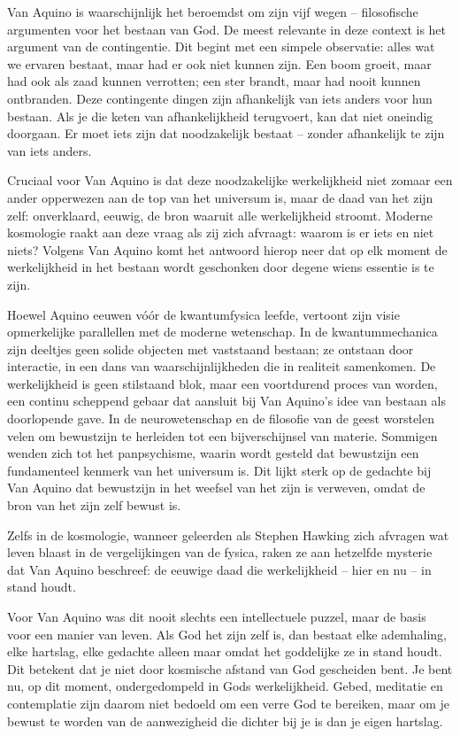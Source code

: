 Van Aquino is waarschijnlijk het beroemdst om zijn vijf wegen – filosofische argumenten voor het bestaan van God. De meest relevante in deze context is het argument van de contingentie. Dit begint met een simpele observatie: alles wat we ervaren bestaat, maar had er ook niet kunnen zijn. Een boom groeit, maar had ook als zaad kunnen verrotten; een ster brandt, maar had nooit kunnen ontbranden. Deze contingente dingen zijn afhankelijk van iets anders voor hun bestaan. Als je die keten van afhankelijkheid terugvoert, kan dat niet oneindig doorgaan. Er moet iets zijn dat noodzakelijk bestaat – zonder afhankelijk te zijn van iets anders.

Cruciaal voor Van Aquino is dat deze noodzakelijke werkelijkheid niet zomaar een ander opperwezen aan de top van het universum is, maar de daad van het zijn zelf: onverklaard, eeuwig, de bron waaruit alle werkelijkheid stroomt. Moderne kosmologie raakt aan deze vraag als zij zich afvraagt: waarom is er iets en niet niets? Volgens Van Aquino komt het antwoord hierop neer dat op elk moment de werkelijkheid in het bestaan wordt geschonken door degene wiens essentie is te zijn.

Hoewel Aquino eeuwen vóór de kwantumfysica leefde, vertoont zijn visie opmerkelijke parallellen met de moderne wetenschap. In de kwantummechanica zijn deeltjes geen solide objecten met vaststaand bestaan; ze ontstaan door interactie, in een dans van waarschijnlijkheden die in realiteit samenkomen. De werkelijkheid is geen stilstaand blok, maar een voortdurend proces van worden, een continu scheppend gebaar dat aansluit bij Van Aquino’s idee van bestaan als doorlopende gave. In de neurowetenschap en de filosofie van de geest worstelen velen om bewustzijn te herleiden tot een bijverschijnsel van materie. Sommigen wenden zich tot het panpsychisme, waarin wordt gesteld dat bewustzijn een fundamenteel kenmerk van het universum is. Dit lijkt sterk op de gedachte bij Van Aquino dat bewustzijn in het weefsel van het zijn is verweven, omdat de bron van het zijn zelf bewust is.

Zelfs in de kosmologie, wanneer geleerden als Stephen Hawking zich afvragen wat leven blaast in de vergelijkingen van de fysica, raken ze aan hetzelfde mysterie dat Van Aquino beschreef: de eeuwige daad die werkelijkheid – hier en nu – in stand houdt.

Voor Van Aquino was dit nooit slechts een intellectuele puzzel, maar de basis voor een manier van leven. Als God het zijn zelf is, dan bestaat elke ademhaling, elke hartslag, elke gedachte alleen maar omdat het goddelijke ze in stand houdt. Dit betekent dat je niet door kosmische afstand van God gescheiden bent. Je bent nu, op dit moment, ondergedompeld in Gods werkelijkheid. Gebed, meditatie en contemplatie zijn daarom niet bedoeld om een verre God te bereiken, maar om je bewust te worden van de aanwezigheid die dichter bij je is dan je eigen hartslag.

